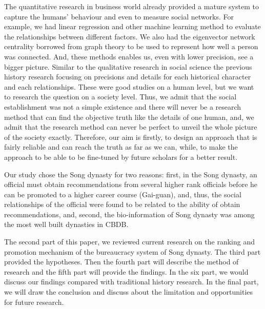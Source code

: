 The quantitative research in business world already provided a mature system to capture the humans' behaviour and even to measure social networks. For example, we had linear regression and other machine learning method to evaluate the relationships between different factors. We also had the eigenvector network centrality borrowed from graph theory to be used to represent how well a person was connected. And, these methods enables us, even with lower precision, see a bigger picture. Similar to the qualitative research in social science the previous history research focusing on precisions and details for each historical character and each relationships. These were good studies on a human level, but we want to research the question on a society level. Thus, we admit that the social establishment was not a simple existence and there will never be a research method that can find the objective truth like the details of one human, and, we admit that the research method can never be perfect to unveil the whole picture of the society exactly. Therefore, our aim is firstly, to design an approach that is fairly reliable and can reach the truth as far as we can, while, to make the approach to be able to be fine-tuned by future scholars for a better result. 

Our study chose the Song dynasty for two reasons: first, in the Song dynasty, an official must obtain recommendations from several higher rank officials before he can be promoted to a higher career course (Gai-guan), and, thus, the social relationships of the official were found to be related to the ability of obtain recommendations, and, second, the bio-information of Song dynasty was among the most well built dynasties in CBDB. 

The second part of this paper, we reviewed current research on the ranking and promotion mechanism of the bureaucracy system of Song dynasty. The third part provided the hypotheses. Then the fourth part will describe the method of research and the fifth part will provide the findings. In the six part, we would discuss our findings compared with traditional history research. In the final part, we will draw the conclusion and discuss about the limitation and opportunities for future research. 
